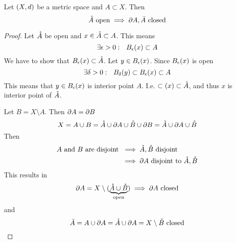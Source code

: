 \documentclass[../../script.tex] {subfiles}
\begin{document}
\begin{thm}
    Let $\metric$ be a metric space and $A \subset X$. Then 
    \[
        \interior{A} \text{ open} \implies \boundary{A}, \closure{A} \text{ closed}
    \]
\end{thm}
\begin{proof}
    Let $\interior{A}$ be open and $x \in \interior{A} \subset A$. This means 
    \begin{equation}
        \exists \epsilon > 0: ~~\oball(x) \subset A
    \end{equation}
    We have to show that $\oball(x) \subset \interior{A}$. Let $y \in \oball(x)$. 
    Since $\oball(x)$ is open
    \begin{equation}
        \exists \delta > 0: ~~\oball[\delta](y) \subset \oball(x) \subset A
    \end{equation}
    This means that $y \in \oball(x)$ is interior point $A$. I.e. $\subset(x) \subset \interior{A}$, and thus $x$ is interior point of $\interior{A}$.

    Let $B = X \setminus A$. Then $\boundary{A} = \boundary{B}$
    \begin{equation}
        X = A \cup B = \interior{A} \cup \boundary{A} \cup \interior{B} \cup \boundary{B} = \interior{A} \cup \boundary{A} \cup \interior{B}
    \end{equation}
    Then 
    \begin{subequations}
    \begin{align}
        A \text{ and } B \text{ are disjoint } &\implies \interior{A}, \interior{B} \text{ disjoint} \\
        &\implies \boundary{A} \text{ disjoint to } \interior{A}, \interior{B}
    \end{align}
    \end{subequations}
    This results in 
    \begin{equation}
        \boundary{A} = X \setminus (\underbrace{\interior{A} \cup \interior{B}}_{\text{open}}) \implies \boundary{A} \text{ closed}
    \end{equation}
    and 
    \begin{equation}
        \closure{A} = A \cup \boundary{A} = \interior{A} \cup \boundary{A} = X \setminus \interior{B} \text{ closed}
    \end{equation}
\end{proof}
\end{document}

